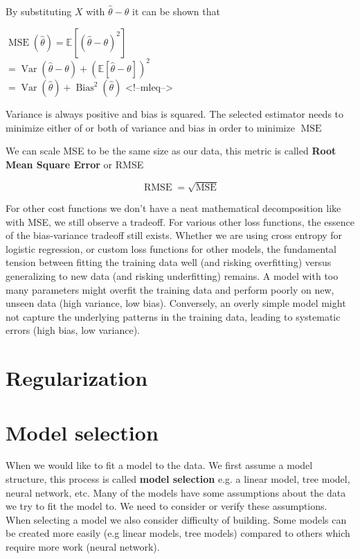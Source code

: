 By substituting \(X\) with \(\hat {\theta }-\theta\) it can be shown that

\(\operatorname{MSE} ({\hat {\theta }})=\mathbb {E} [({\hat {\theta }}-\theta )^{2}]\)\\
\(=\operatorname {Var} ({\hat {\theta }}-\theta )+(\mathbb {E} [{\hat {\theta }}-\theta ])^{2}\)\\
\(=\operatorname {Var} ({\hat {\theta }})+\operatorname {Bias} ^{2}({\hat {\theta }})\)
<!--mleq-->

Variance is always positive and bias is squared. The selected estimator needs to minimize either of or both of variance and bias in order to minimize \(\operatorname{MSE}\)

We can scale MSE to be the same size as our data, this metric is called \textbf{Root Mean Square Error} or RMSE

\[\operatorname{RMSE} = \sqrt{\operatorname{MSE}}\]

For other cost functions we don't have a neat mathematical decomposition like with MSE, we still observe a tradeoff. For various other loss functions, the essence of the bias-variance tradeoff still exists. Whether we are using cross entropy for logistic regression, or custom loss functions for other models, the fundamental tension between fitting the training data well (and risking overfitting) versus generalizing to new data (and risking underfitting) remains. A model with too many parameters might overfit the training data and perform poorly on new, unseen data (high variance, low bias). Conversely, an overly simple model might not capture the underlying patterns in the training data, leading to systematic errors (high bias, low variance).

\section{Regularization}

\section{Model selection}

When we would like to fit a model to the data. We first assume a model structure, this process is called \textbf{model selection} e.g. a linear model, tree model, neural network, etc. Many of the models have some assumptions about the data we try to fit the model to. We need to consider or verify these assumptions. When selecting a model we also consider difficulty of building. Some models can be created more easily (e.g linear models, tree models) compared to others which require more work (neural network).

